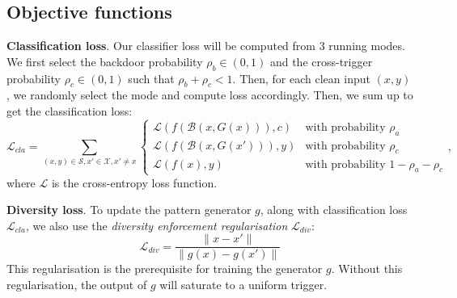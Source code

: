 \documentclass{article}
\begin{document}
\subsection{Objective functions}
{\bfseries Classification loss}. Our classifier loss will be computed from 3 running modes. We first select the backdoor probability $\rho_b \in (0, 1)$ and the cross-trigger probability $\rho_c \in (0, 1)$ such that  $\rho_b + \rho_c < 1$. Then, for each clean input $(x, y)$, we randomly select the mode and compute loss accordingly. Then, we sum up to get the classification loss:
\begin{equation}
\mathcal{L}_{cla}=\sum_{(x,y)\in\mathcal{S}, x'\in\mathcal{X}, x' \neq x}\begin{cases}
\mathcal{L}(f(\mathcal{B}(x,G(x))),c) & \text{with probability } \rho_a\\
\mathcal{L}(f(\mathcal{B}(x,G(x'))),y) &\text{with probability } \rho_c\\
\mathcal{L}(f(x),y) &\text{with probability } 1-\rho_a-\rho_c\end{cases},
\end{equation}
where $\mathcal{L}$ is the cross-entropy loss function.

{\bfseries Diversity loss}. To update the pattern generator $g$, along with classification loss $\mathcal{L}_{cla}$, we also use the {\itshape diversity enforcement regularisation} $\mathcal{L}_{div}$:
\begin{equation*}
    \mathcal{L}_{div} = \frac{\|x-x'\|}{\|g(x)-g(x')\|}
\end{equation*}
This regularisation is the prerequisite for training the generator $g$. Without this regularisation, the output of $g$ will saturate to a uniform trigger.
\end{document}
